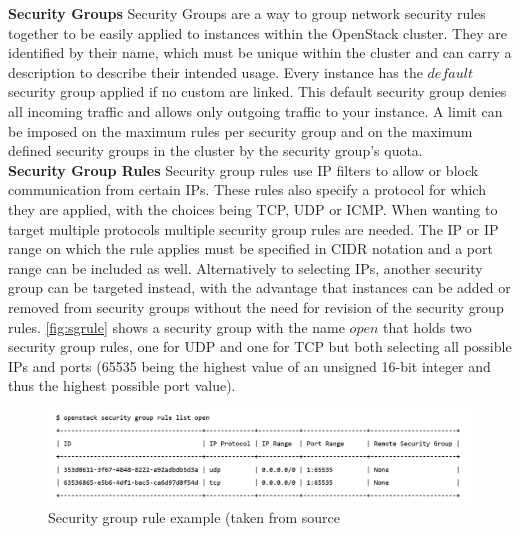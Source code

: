 \textbf{Security Groups}\label{sec:securitygroups} Security Groups are a way to group network security rules together to be easily applied to instances within the OpenStack cluster. They are identified by their name, which must be unique within the cluster and can carry a description to describe their intended usage. Every instance has the $default$ security group applied if no custom are linked. This default security group denies all incoming traffic and allows only outgoing traffic to your instance. A limit can be imposed on the maximum rules per security group and on the maximum defined security groups in the cluster by the security group's quota. \cite{sg} \cite{sgquotas}
\\[10pt]

\textbf{Security Group Rules}\label{sec:securitygrouprules} Security group rules use IP filters to allow or block communication from certain IPs. These rules also specify a protocol for which they are applied, with the choices being TCP, UDP or ICMP. When wanting to target multiple protocols multiple security group rules are needed. The IP or IP range on which the rule applies must be specified in CIDR notation and a port range can be included as well. Alternatively to selecting IPs, another security group can be targeted instead, with the advantage that instances can be added or removed from security groups without the need for revision of the security group rules. \autoref{fig:sgrule} shows a security group with the name $open$ that holds two security group rules, one for UDP and one for TCP but both selecting all possible IPs and ports (65535 being the highest value of an unsigned 16-bit integer and thus the highest possible port value). \cite{sgrule}
\\[10pt]

\begin{figure}[htbp]
  \centering
  \includegraphics[width=\textwidth]{images/sgrule example.png} 
  \caption{Security group rule example (taken from source \cite{sg}}
  \label{fig:sgrule}
\end{figure}

\cleardoublepage
